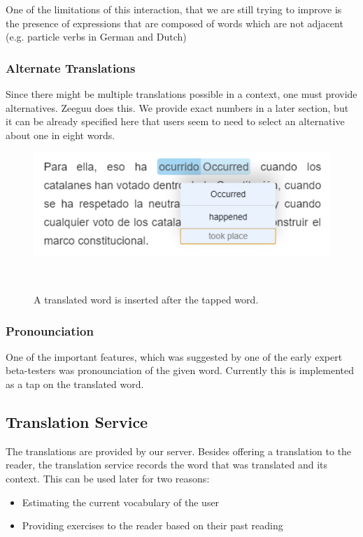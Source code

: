 One of the limitations of this interaction, that we are still trying to improve is the presence of expressions that are composed of words which are not adjacent (e.g. particle verbs in German and Dutch)


\subsubsection{Alternate Translations}
Since there might be multiple translations possible in a context, one must provide alternatives. Zeeguu does this. We provide exact numbers in a later section, but it can be already specified here that users seem to need to select an alternative about one in eight words.

\begin{figure}[h!]
\centering
  \includegraphics[width=0.8\columnwidth]{figures/translation_alter_menu}
  \caption{A translated word is inserted after the tapped word.}~\label{fig:registrations}
\end{figure}


\subsubsection{Pronounciation}
One of the important features, which was suggested by one of the early expert beta-testers was pronounciation of the given word. Currently this is implemented as a tap on the translated word.


\subsection {Translation Service}

The translations are provided by our server. Besides offering a translation to the reader, the translation service records the word that was translated and its context. This can be used later for two reasons: 

\begin{itemize}
	\item Estimating the current vocabulary of the user
	\item Providing exercises to the reader based on their past reading
\end{itemize}

